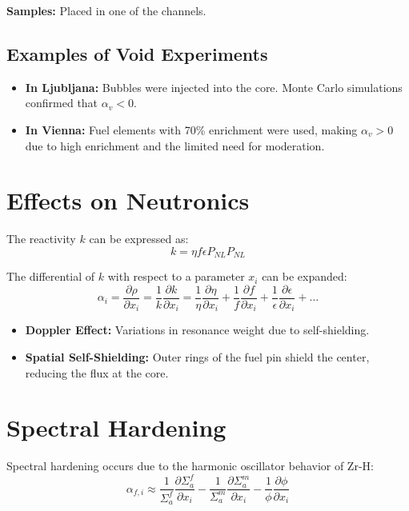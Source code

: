 \textbf{Samples:} Placed in one of the channels.

\subsection{Examples of Void Experiments}
\begin{itemize}
    \item \textbf{In Ljubljana:} Bubbles were injected into the core. Monte Carlo simulations confirmed that $\alpha_v < 0$.
    \item \textbf{In Vienna:} Fuel elements with 70\% enrichment were used, making $\alpha_v > 0$ due to high enrichment and the limited need for moderation.
\end{itemize}

\section{Effects on Neutronics}

The reactivity $k$ can be expressed as:
\begin{equation}
    k = \eta f \epsilon P_{NL} P_{NL}
\end{equation}

The differential of $k$ with respect to a parameter $x_i$ can be expanded:
\begin{equation}
    \alpha_i = \frac{\partial \rho}{\partial x_i} = \frac{1}{k} \frac{\partial k}{\partial x_i} = \frac{1}{\eta} \frac{\partial \eta}{\partial x_i} + \frac{1}{f} \frac{\partial f}{\partial x_i} + \frac{1}{\epsilon} \frac{\partial \epsilon}{\partial x_i} + \dots
\end{equation}

\begin{itemize}
    \item \textbf{Doppler Effect:} Variations in resonance weight due to self-shielding.
    \item \textbf{Spatial Self-Shielding:} Outer rings of the fuel pin shield the center, reducing the flux at the core.
\end{itemize}

\section{Spectral Hardening}

Spectral hardening occurs due to the harmonic oscillator behavior of Zr-H:
\begin{equation}
    \alpha_{f,i} \approx \frac{1}{\Sigma_a^f} \frac{\partial \Sigma_a^f}{\partial x_i} - \frac{1}{\Sigma_a^m} \frac{\partial \Sigma_a^m}{\partial x_i} - \frac{1}{\phi} \frac{\partial \phi}{\partial x_i}
\end{equation}

